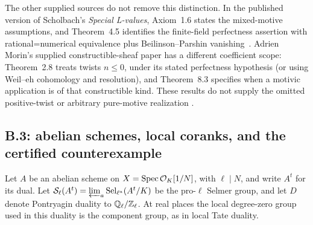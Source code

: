 The other supplied sources do not remove this distinction.  In the
published version of Scholbach's \emph{Special L-values}, Axiom~1.6
states the mixed-motive assumptions, and Theorem~4.5 identifies the
finite-field perfectness assertion with rational=numerical equivalence
plus Beilinson--Parshin vanishing~\cite{BScholbachSpecial2017}.
Adrien Morin's supplied constructible-sheaf paper has a different
coefficient scope: Theorem~2.8 treats twists \(n\le0\), under
its stated perfectness hypothesis (or using Weil--eh cohomology and
resolution), and Theorem~8.3 specifies when a motivic application is
of that constructible kind.  These results do not supply the omitted
positive-twist or arbitrary pure-motive realization
\cite{BAdrienMorin2024}.

\subsection{B.3: abelian schemes, local coranks, and the certified counterexample}
Let \(A\) be an abelian scheme on
\(X=\operatorname{Spec}\mathcal O_K[1/N]\), with \(\ell\mid N\), and write
\(A^t\) for its dual.  Let
\(\mathcal S_\ell(A^t)=\varprojlim_a\operatorname{Sel}_{\ell^a}(A^t/K)\)
be the pro-\(\ell\) Selmer group, and let \(D\) denote Pontryagin
duality to \(\mathbb Q_\ell/\mathbb Z_\ell\).  At real places the local degree-zero
group used in this duality is the component group, as in local Tate
duality.

